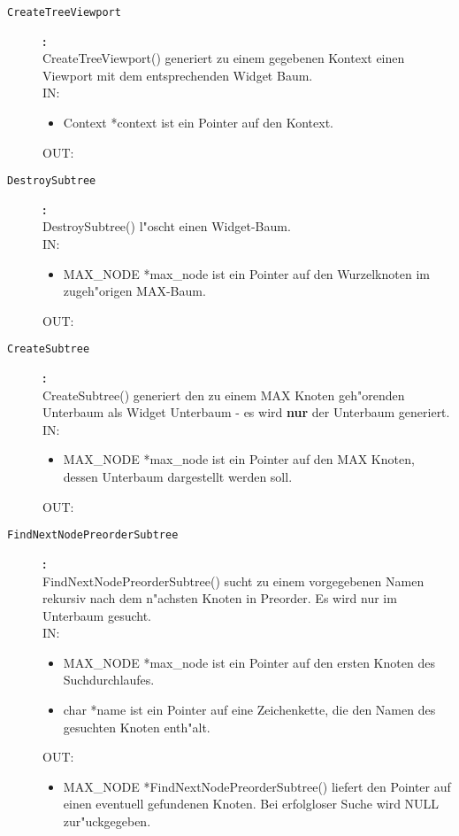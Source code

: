 \begin{description}
\item[\tt CreateTreeViewport]{\bf :\\}
CreateTreeViewport() generiert zu einem gegebenen Kontext einen Viewport mit dem entsprechenden Widget Baum. \\
IN:
\begin{itemize}
   \item Context *context ist ein Pointer auf den Kontext.
\end{itemize}
OUT:

\item[\tt DestroySubtree]{\bf :\\}
DestroySubtree() l"oscht einen Widget-Baum. \\
IN:
\begin{itemize}
   \item MAX\_NODE *max\_node ist ein Pointer auf den Wurzelknoten im zugeh"origen MAX-Baum.
\end{itemize}
OUT:

\item[\tt CreateSubtree]{\bf :\\}
CreateSubtree() generiert den zu einem MAX Knoten geh"orenden Unterbaum als Widget Unterbaum - es wird {\bf nur} der Unterbaum generiert. \\
IN:
\begin{itemize}
   \item MAX\_NODE *max\_node ist ein Pointer auf den MAX Knoten, dessen Unterbaum dargestellt werden soll.
\end{itemize}
OUT:

\item[\tt FindNextNodePreorderSubtree]{\bf :\\}
FindNextNodePreorderSubtree() sucht zu einem vorgegebenen Namen rekursiv nach dem n"achsten Knoten in Preorder. Es wird nur im Unterbaum gesucht. \\
IN:
\begin{itemize}
   \item MAX\_NODE *max\_node ist ein Pointer auf den ersten Knoten des Suchdurchlaufes.
   \item char *name ist ein Pointer auf eine Zeichenkette, die den Namen des gesuchten Knoten enth"alt.
\end{itemize}
OUT:
\begin{itemize}
   \item MAX\_NODE *FindNextNodePreorderSubtree() liefert den Pointer auf einen eventuell gefundenen Knoten. Bei erfolgloser Suche wird NULL zur"uckgegeben.
\end{itemize}


\end{description}
